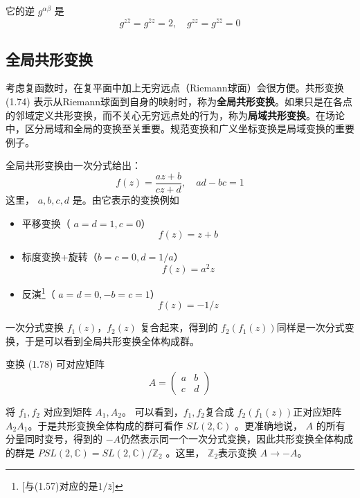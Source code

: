 它的逆 $g^{\alpha\beta}$ 是
\begin{equation}
	g^{z \bar{z}}=g^{\bar{z} z}=2, \quad g^{z z}=g^{\bar{z} \bar{z}}=0
\end{equation}

\subsection{全局共形变换}

考虑复函数时，在复平面中加上无穷远点（Riemann球面）会很方便。共形变换 (1.74) 表示从Riemann球面到自身的映射时，称为\textbf{全局共形变换}。如果只是在各点的邻域定义共形变换，而不关心无穷远点处的行为，称为\textbf{局域共形变换}。在场论中，区分局域和全局的变换至关重要。规范变换和广义坐标变换是局域变换的重要例子。

全局共形变换由一次分式给出：
\begin{equation}
f(z)=\frac{a z+b}{c z+d}, \quad a d-b c=1
\end{equation}
这里， $a,b,c,d$ 是。由它表示的变换例如
\begin{itemize}
	\item 平移变换（ $a=d=1 , c=0 $）
	\[f(z)=z+b\]
	\item 标度变换+旋转（$ b=c=0 , d=1/a $）
	\[ f(z)=a^2 z\]
	\item 反演\footnote{[与(1.57)对应的是$1/\bar z$]}（ $a=d=0 , -b=c=1 $）
	\[ f(z)=-1/z\]
\end{itemize}

一次分式变换 $f_1(z) $，$ f_2(z)$ 复合起来，得到的 $f_2(f_1(z)) $同样是一次分式变换，于是可以看到全局共形变换全体构成群。

变换 (1.78) 可对应矩阵
\begin{equation}
	A=\left(\begin{array}{ll} a & b \\ c & d \end{array}\right)
\end{equation}

将 $f_1,f_2$ 对应到矩阵 $A_1,A_2 $。 可以看到，$f_1,f_2 $复合成 $f_2(f_1(z)) $正对应矩阵 $A_2A_1 $。于是共形变换全体构成的群可看作 $SL(2,\mathbb{C})$ 。更准确地说， $A$ 的所有分量同时变号，得到的 $-A $仍然表示同一个一次分式变换，因此共形变换全体构成的群是 $PSL(2,\mathbb{C})=SL(2,\mathbb{C})/\mathbb{Z}_2$ 。这里， $\mathbb{Z}_2 $表示变换 $A\to -A $。

